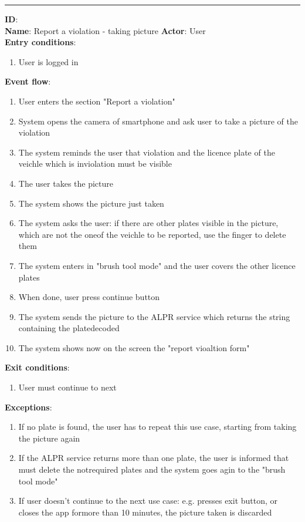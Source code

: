 	\rule{\linewidth}{0.4pt}
  \textbf{ID}:  \\
  \textbf{Name}: Report a violation - taking picture
  \textbf{Actor}: User   \\
  \textbf{Entry conditions}:
  \begin{enumerate}
    \item{User is logged in}
  \end{enumerate}
  \textbf{Event flow}:
  \begin{enumerate}
    \item{User enters the section "Report a violation"}
    \item{System opens the camera of smartphone and ask user to take a picture of the violation}
    \item{The system reminds the user that violation and the licence plate of the veichle which is inviolation must be visible }
    \item{The user takes the picture }
    \item{The system shows the picture just taken }
    \item{The system asks the user: if there are other plates visible in the picture, which are not the oneof the veichle to be reported, use the finger to delete them }
    \item{The system enters in "brush tool mode" and the user covers the other licence plates}
    \item{When done, user press continue button}
    \item{The system sends the picture to the ALPR service which returns the string containing the platedecoded}
    \item{The system shows now on the screen the "report vioaltion form"}
  \end{enumerate}
  \textbf{Exit conditions}:
  \begin{enumerate}
    \item{User must continue to next }
  \end{enumerate}
  \textbf{Exceptions}:
  \begin{enumerate}
    \item{If no plate is found, the user has to repeat this use case, starting from taking the picture again}
    \item{If the ALPR service returns more than one plate, the user is informed that must delete the notrequired plates and the system goes agin to the "brush tool mode"}
    \item{If user doesn't continue to the next use case: e.g. presses exit button, or closes the app formore than 10 minutes, the picture taken is discarded}
  \end{enumerate}
